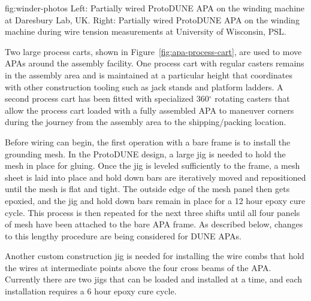 \begin{dunefigure}{fig:winder-photos}
{Left: Partially wired ProtoDUNE APA on the winding machine at Daresbury Lab, UK. Right: Partially wired ProtoDUNE APA on the winding machine during wire tension measurements at University of Wisconsin, PSL.}
\setlength{\fboxsep}{0pt}
\setlength{\fboxrule}{0.5pt}
\end{dunefigure}

Two large process carts, shown in Figure~\ref{fig:apa-process-cart}, are used to move APAs around the assembly facility. 
One process cart with regular casters remains in the assembly area and is maintained at a particular height that coordinates with other construction tooling such as jack stands and platform ladders. A second process cart has been fitted with specialized 360$^\circ$ rotating casters that allow the process cart loaded with a fully assembled APA to maneuver corners during the journey from the assembly area to the shipping/packing location.

Before wiring can begin, the first operation with a bare frame is to install the grounding mesh. In the ProtoDUNE design, a large jig is needed to hold the mesh in place for gluing. Once the jig is leveled sufficiently to the frame, a mesh sheet is laid into place and hold down bars are iteratively moved and repositioned until the mesh is flat and tight.  The outside edge of the mesh panel then gets epoxied, and the jig and hold down bars remain in place for a 12 hour epoxy cure cycle.  This process is then repeated for the next three shifts until all four panels of mesh have been attached to the bare APA frame.  As described below, changes to this lengthy procedure are being considered for DUNE APAs.  

Another custom construction jig is needed for installing the wire combs that hold the wires at intermediate points above the four cross beams of the APA.  Currently there are two jigs that can be loaded and installed at a time, and each installation requires a 6 hour epoxy cure cycle. %

